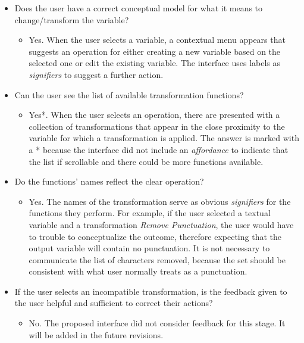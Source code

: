 \documentclass[12pt,letterpaper]{article}
\begin{document}
\begin{itemize}
    \begin{itemize}
        \item Does the user have a correct conceptual model for what it means to change/transform the variable?
        \begin{itemize}
                \item Yes. When the user selects a variable, a contextual menu appears that suggests an operation for either creating a new variable based on the selected one or edit the existing variable. The interface uses labels as \textit{signifiers} to suggest a further action.
        \end{itemize}
        \item Can the user see the list of available transformation functions?
        \begin{itemize}
                \item Yes*. When the user selects an operation, there are presented with a collection of transformations that appear in the close proximity to the variable for which a transformation is applied. The answer is marked with a * because the interface did not include an \textit{affordance} to indicate that the list if scrollable and there could be more functions available.
        \end{itemize}
        \item Do the functions' names reflect the clear operation?
        \begin{itemize}
                \item Yes. The names of the transformation serve as obvious \textit{signifiers} for the functions they perform. For example, if the user selected a textual variable and a transformation \textit{Remove Punctuation}, the user would have to trouble to conceptualize the outcome, therefore expecting that the output variable will contain no punctuation. It is not necessary to communicate the list of characters removed, because the set should be consistent with what user normally treats as a punctuation. 
        \end{itemize}
        \item If the user selects an incompatible transformation, is the feedback given to the user helpful and sufficient to correct their actions?
        \begin{itemize}
                \item No. The proposed interface did not consider feedback for this stage. It will be added in the future revisions.   
        \end{itemize}

\end{itemize}
\end{itemize}
\end{document}
